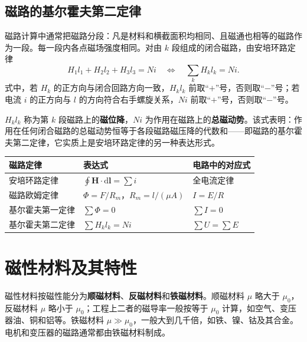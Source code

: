 \subsection{磁路的基尔霍夫第二定律}
磁路计算中通常把磁路分段：凡是材料和横截面积均相同、且磁通也相等的磁路作为一段。每一段内各点磁场强度相同。对由 $k$ 段组成的闭合磁路，由安培环路定律
\begin{equation}
H_1l_1+H_2l_2+H_3l_3=Ni
\quad\Longleftrightarrow\quad
\sum_{k}H_k l_k=Ni .
\end{equation}
式中，若 $H_k$ 的正方向与闭合回路方向一致，$H_kl_k$ 前取“$+$”号，否则取“$-$”号；若电流 $i$ 的正方向与 $l$ 的方向符合右手螺旋关系，$Ni$ 前取“$+$”号，否则取“$-$”号。


$H_kl_k$ 称为第 $k$ 段磁路上的\textbf{磁位降}，$Ni$ 为作用在磁路上的\textbf{总磁动势}。该式表明：作用在任何闭合磁路的总磁动势恒等于各段磁路磁压降的代数和——即磁路的基尔霍夫第二定律，它实质上是安培环路定律的另一种表达形式。

\begin{center}
\begin{tabular}{@{}lll@{}}
\toprule
磁路定律 & 表达式 & 电路中的对应式 \\
\midrule
安培环路定律 & $\oint \boldsymbol{H}\cdot\mathrm{d}\boldsymbol{l}=\sum i$ & 全电流定律 \\
磁路欧姆定律 & $\Phi=F/R_m$，$R_m=l/(\mu A)$ & $I=E/R$ \\
基尔霍夫第一定律 & $\sum\Phi=0$ & $\sum I=0$ \\
基尔霍夫第二定律 & $\sum H_k l_k=Ni$ & $\sum U=\sum E$ \\
\bottomrule
\end{tabular}
\end{center}


\section{磁性材料及其特性}

磁性材料按磁性能分为\textbf{顺磁材料}、\textbf{反磁材料}和\textbf{铁磁材料}。顺磁材料 $\mu$ 略大于 $\mu_0$，反磁材料 $\mu$ 略小于 $\mu_0$；工程上二者的磁导率一般按等于 $\mu_0$ 计算，如空气、变压器油、铜和铝等。铁磁材料 $\mu\gg\mu_0$，一般大到几千倍，如铁、镍、钴及其合金。电机和变压器的磁路通常都由铁磁材料制成。

